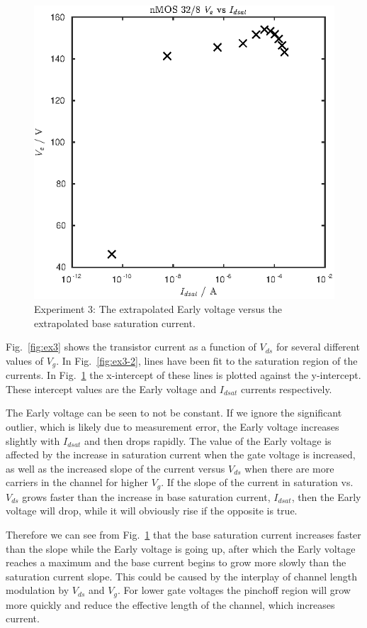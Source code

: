 \begin{figure}[!htb]
    \center
    \includegraphics{ex3-3.eps}
    \caption{Experiment 3: The extrapolated Early voltage versus the extrapolated base saturation current.}
    \label{fig:ex3-3}
\end{figure}
Fig.~\ref{fig:ex3} shows the transistor current as a function of \(V_{ds}\) for several different values of \(V_g\). In Fig.~\ref{fig:ex3-2}, lines have been
fit to the saturation region of the currents. In Fig.~\ref{fig:ex3-3} the x-intercept of these lines is plotted against the y-intercept. These intercept
values are the Early voltage and \(I_{dsat}\) currents respectively. 

The Early voltage can be seen to not be constant. If we ignore the significant outlier, which is likely due to measurement error, the Early voltage increases
slightly with \(I_{dsat}\) and then drops rapidly. The value of the Early voltage is affected by the increase in saturation current when the gate voltage is increased,
as well as the increased slope of the current versus \(V_{ds}\) when there are more carriers in the channel for higher \(V_g\). If the slope of the 
current in saturation vs. \(V_{ds}\) grows faster than the increase in base saturation current, \(I_{dsat}\), then the Early voltage will drop, while it
will obviously rise if the opposite is true.

Therefore we can see from Fig.~\ref{fig:ex3-3} that the base saturation current increases faster than the slope while the Early voltage is going up, 
after which the Early voltage reaches a maximum and the base current begins to grow more slowly than the saturation current slope. This could be
caused by the interplay of channel length modulation by \(V_{ds}\) and \(V_g\). For lower gate voltages the pinchoff region will grow more quickly and
reduce the effective length of the channel, which increases current.


